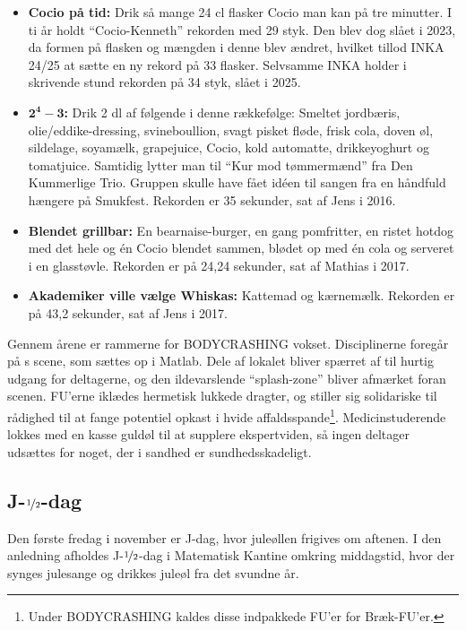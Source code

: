 \begin{itemize}
    \item \textbf{Cocio på tid:} Drik så mange 24 cl flasker Cocio man kan på tre minutter. I ti år holdt ``Cocio-Kenneth'' rekorden med 29 styk. Den blev dog slået i 2023, da formen på flasken og mængden i denne blev ændret, hvilket tillod INKA 24/25 at sætte en ny rekord på 33 flasker. Selvsamme INKA holder i skrivende stund rekorden på 34 styk, slået i 2025.
    \item $\boldsymbol{2^4-3}$\textbf{:} Drik 2 dl af følgende i denne rækkefølge: Smeltet jordbæris, olie/eddike-dressing, svineboullion, svagt pisket fløde, frisk cola, doven øl, sildelage, soyamælk, grapejuice, Cocio, kold automatte, drikkeyoghurt og tomatjuice. Samtidig lytter man til ``Kur mod tømmermænd'' fra Den Kummerlige Trio. Gruppen skulle have fået idéen til sangen fra en håndfuld hængere på Smukfest. Rekorden er  35 sekunder, sat af Jens i 2016.
    \item \textbf{Blendet grillbar:} En bearnaise-burger, en gang pomfritter, en ristet hotdog med det hele og én Cocio blendet sammen, blødet op med én cola og serveret i en glasstøvle. Rekorden er på 24,24 sekunder, sat af Mathias i 2017.
    \item \textbf{Akademiker ville vælge Whiskas:} Kattemad og kærnemælk. Rekorden er på 43,2 sekunder, sat af Jens i 2017.
\end{itemize}

\noindent Gennem årene er rammerne for BODYCRASHING vokset. Disciplinerne foregår på \CERM{}s scene, som sættes op i Matlab. Dele af lokalet bliver spærret af til hurtig udgang for deltagerne, og den ildevarslende ``splash-zone'' bliver afmærket foran scenen. FU'erne iklædes hermetisk lukkede dragter, og stiller sig solidariske til rådighed til at fange potentiel opkast i hvide affaldsspande\footnote{Under BODYCRASHING kaldes disse indpakkede FU'er for Bræk-FU'er.}. Medicinstuderende lokkes med en kasse guldøl til at supplere ekspertviden, så ingen deltager udsættes for noget, der i sandhed er sundhedsskadeligt.

\subsection{J-$\nicefrac{1}{2}$-dag}
Den første fredag i november er J-dag, hvor juleøllen frigives om aftenen. I den anledning afholdes J-$\nicefrac{1}{2}$-dag i Matematisk Kantine omkring middagstid, hvor der synges julesange og drikkes juleøl fra det svundne år.

